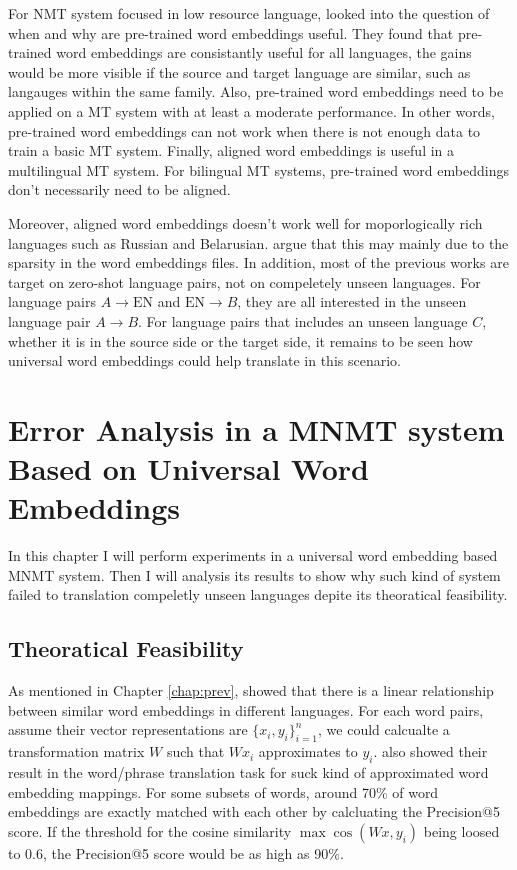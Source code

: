 \documentclass[thesis,fonts=libertine]{cluu}
\begin{document}
For NMT system focused in low resource language, \cite{Qi:2018aa} looked into the question of when and why are pre-trained word embeddings useful. They found that pre-trained word embeddings are consistantly useful for all languages, the gains would be more visible if the source and target language are similar, such as langauges within the same family. Also, pre-trained word embeddings need to be applied on a MT system with at least a moderate performance. In other words, pre-trained word embeddings can not work when there is not enough data to train a basic MT system. Finally, aligned word embeddings is useful in a multilingual MT system. For bilingual MT systems, pre-trained word embeddings don't necessarily need to be aligned.

Moreover, aligned word embeddings doesn't work well for moporlogically rich languages such as Russian and Belarusian. \cite{Qi:2018aa} argue that this may mainly due to the sparsity in the word embeddings files. In addition, most of the previous works are target on zero-shot language pairs, not on compeletely unseen languages. For language pairs $A \rightarrow \text{EN}$ and $\text{EN} \rightarrow B$, they are all interested in the unseen language pair $A \rightarrow B$. For language pairs that includes an unseen language $C$, whether it is in the source side or the target side, it remains to be seen how universal word embeddings could help translate in this scenario.

\chapter{Error Analysis in a MNMT system Based on Universal Word Embeddings}
\label{chap:error}

In this chapter I will perform experiments in a universal word embedding based MNMT system. Then I will analysis its results to show why such kind of system failed to translation compeletly unseen languages depite its theoratical feasibility.

\section{Theoratical Feasibility}

As mentioned in Chapter \ref{chap:prev}, \cite{Mikolov:2013ac} showed that there is a linear relationship between similar word embeddings in different languages. For each word pairs, assume their vector representations are $\{x_i, y_i\}_{i=1}^n$, we could calcualte a transformation matrix $W$ such that $Wx_i$ approximates to $y_i$. \cite{Mikolov:2013ac} also showed their result in the word/phrase translation task for suck kind of approximated word embedding mappings. For some subsets of words, around 70\% of word embeddings are exactly matched with each other by calcluating the Precision@5 score. If the threshold for the cosine similarity $\max\cos(Wx, y_i)$ being loosed to 0.6, the Precision@5 score would be as high as 90\%.
\end{document}
